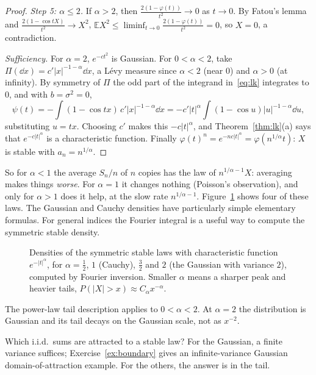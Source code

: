 \begin{proof}
\emph{Step 5: $\alpha\le2$.} If $\alpha>2$, then $\frac{2(1-\varphi(t))}{t^2}\to0$ as $t\to0$. By Fatou's lemma and $\frac{2(1-\cos tX)}{t^2}\to X^2$,
$\mathbb EX^2\le\liminf_{t\to0}\frac{2(1-\varphi(t))}{t^2}=0$, so $X=0$, a contradiction.

\emph{Sufficiency.} For $\alpha=2$, $e^{-ct^2}$ is Gaussian. For $0<\alpha<2$, take $\Pi(\dd x)=c'|x|^{-1-\alpha}\dd x$, a L\'evy measure since $\alpha<2$ (near $0$)
and $\alpha>0$ (at infinity). By symmetry of $\Pi$ the odd part of the integrand in~\eqref{eq:lk} integrates to $0$, and with $b=\sigma^2=0$,
\[
\psi(t)=-\int(1-\cos tx)\,c'|x|^{-1-\alpha}\dd x=-c'|t|^\alpha\int(1-\cos u)|u|^{-1-\alpha}\dd u,
\]
substituting $u=tx$. Choosing $c'$ makes this $-c|t|^\alpha$, and Theorem~\ref{thm:lk}(a) says that $e^{-c|t|^\alpha}$ is a characteristic function. Finally
$\varphi(t)^n=e^{-nc|t|^\alpha}=\varphi(n^{1/\alpha}t)$: $X$ is stable with $a_n=n^{1/\alpha}$.
\end{proof}

So for $\alpha<1$ the average $S_n/n$ of $n$ copies has the law of $n^{1/\alpha-1}X$: averaging makes things \emph{worse}. For $\alpha=1$ it changes
nothing (Poisson's observation), and only for $\alpha>1$ does it help, at the slow rate $n^{1/\alpha-1}$. Figure~\ref{fig:stable} shows four of these laws. The Gaussian and Cauchy densities have particularly simple elementary formulas. For general indices the Fourier integral is a useful way to compute the symmetric stable density.

\begin{figure}[ht]
\centering{}
\caption{Densities of the symmetric stable laws with characteristic function $e^{-|t|^\alpha}$, for $\alpha=\frac12$, $1$ (Cauchy), $\frac32$ and $2$ (the
Gaussian with variance $2$), computed by Fourier inversion. Smaller $\alpha$ means a sharper peak and heavier tails, $P(|X|>x)\approx C_\alpha x^{-\alpha}$.}
\label{fig:stable}
\end{figure}

The power-law tail description applies to $0<\alpha<2$. At $\alpha=2$ the distribution is Gaussian and its tail decays on the Gaussian scale, not as $x^{-2}$.

Which i.i.d.\ sums are attracted to a stable law? For the Gaussian, a finite variance suffices; Exercise~\ref{ex:boundary} gives an infinite-variance Gaussian domain-of-attraction example. For the others, the answer is
in the tail.

